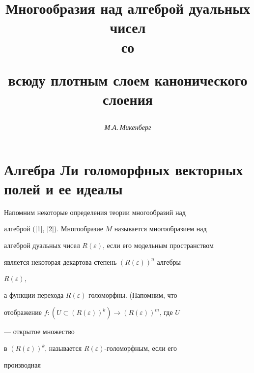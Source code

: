  


\author{\it М.А.\,Микенберг} 




\title{Многообразия над алгеброй дуальных чисел\\ со  


всюду плотным слоем канонического слоения} 


 


\date{} 




\pagestyle{plain} %


 




\maketitle 


\label{begin} 


 


 


\section{Алгебра Ли голоморфных векторных полей и ее идеалы} 


 


Напомним некоторые определения теории многообразий над 


алгеброй ([1], [2]). Многообразие $M$ называется многообразием над 


алгеброй дуальных чисел $R(\varepsilon)$, если его модельным пространством 


является некоторая декартова степень $(R(\varepsilon))^n$ алгебры 


$R(\varepsilon)$, 


а функции перехода $R(\varepsilon)$-голоморфны. (Напомним, что 


отображение $f:(U\subset(R(\varepsilon))^k)\to (R(\varepsilon))^m$, где $U$ 


--- открытое множество 


в $(R(\varepsilon))^k$, называется $R(\varepsilon)$-голоморфным, если его 


производная 



